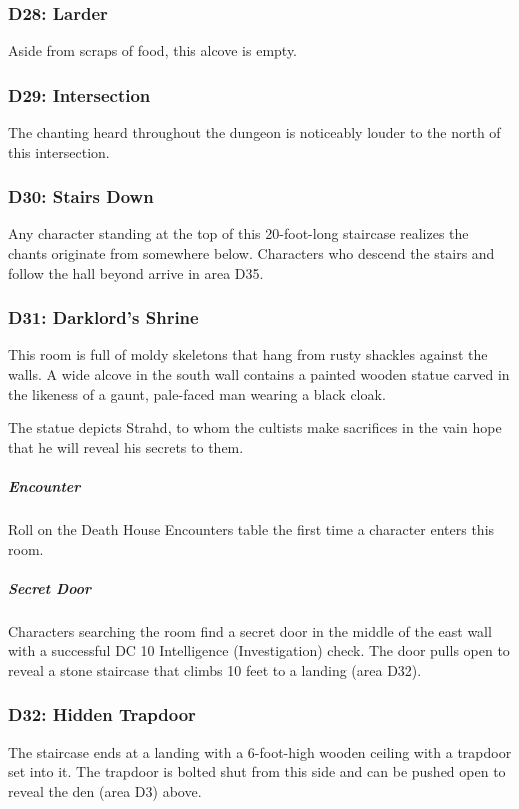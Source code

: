 \documentclass[10pt,a4paper,twoside,bg=print,twocolumn,openany,nodeprecatedcode]{dndbook}
\begin{document}
\subsubsection{D28: Larder}
Aside from scraps of food, this alcove is empty.

\subsubsection{D29: Intersection}
The chanting heard throughout the dungeon is noticeably louder to the north of this intersection.

\subsubsection{D30: Stairs Down}
Any character standing at the top of this 20-foot-long staircase realizes the chants originate from somewhere below. Characters who descend the stairs and follow the hall beyond arrive in area D35.

\subsubsection{D31: Darklord's Shrine}
\begin{DndReadAloud}{}
This room is full of moldy skeletons that hang from rusty shackles against the walls. A wide alcove in the south wall contains a painted wooden statue carved in the likeness of a gaunt, pale-faced man wearing a black cloak.

\end{DndReadAloud}

The statue depicts Strahd, to whom the cultists make sacrifices in the vain hope that he will reveal his secrets to them.

\subparagraph{Encounter}
Roll on the Death House Encounters table the first time a character enters this room.

\subparagraph{Secret Door}
Characters searching the room find a secret door in the middle of the east wall with a successful DC 10 Intelligence (Investigation) check. The door pulls open to reveal a stone staircase that climbs 10 feet to a landing (area D32).

\subsubsection{D32: Hidden Trapdoor}
The staircase ends at a landing with a 6-foot-high wooden ceiling with a trapdoor set into it. The trapdoor is bolted shut from this side and can be pushed open to reveal the den (area D3) above.
\end{document}
